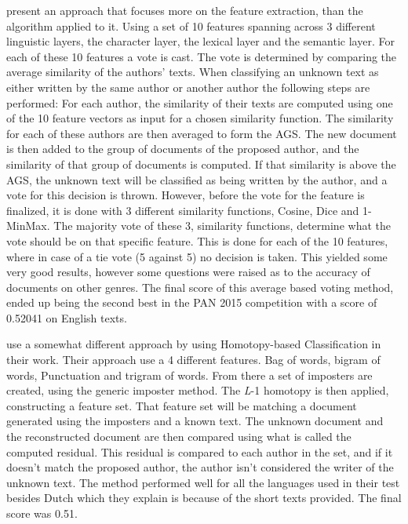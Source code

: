\cite{castro2015Paper} present an approach that focuses more on the feature
extraction, than the algorithm applied to it. Using a set of 10 features
spanning across 3 different linguistic layers, the character layer, the lexical
layer and the semantic layer. For each of these 10 features a vote is cast. The
vote is determined by comparing the average similarity of the authors' texts.
When classifying an unknown text as either written by the same author or another
author the following steps are performed: For each author, the similarity of
their texts are computed using one of the 10 feature vectors as input for a
chosen similarity function. The similarity for each of these authors are then
averaged to form the \gls{AGS}. The new document is then added to the group of
documents of the proposed author, and the similarity of that group of documents
is computed. If that similarity is above the \gls{AGS}, the unknown text will
be classified as being written by the author, and a vote for this decision is
thrown. However, before the vote for the feature is finalized, it is done with
3 different similarity functions, Cosine, Dice and 1-MinMax. The majority vote
of these 3, similarity functions, determine what the vote should be on that
specific feature. This is done for each of the 10 features, where in case of
a tie vote (5 against 5) no decision is taken. This yielded some very good
results, however some questions were raised as to the accuracy of documents on
other genres. The final score of this average based voting method, ended up
being the second best in the PAN 2015 competition with a score of 0.52041 on
English texts.

\cite{gutierrez2015} use a somewhat different approach by using Homotopy-based
Classification in their work. Their approach use a 4 different features. Bag
of words, bigram of words, Punctuation and trigram of words. From there a set
of imposters are created, using the generic imposter method. The \textit{L}-1
homotopy is then applied, constructing a feature set. That feature set will be
matching a document generated using the imposters and a known text. The unknown
document and the reconstructed document are then compared using what is called
the computed residual. This residual is compared to each author in the set,
and if it doesn't match the proposed author, the author isn't considered the
writer of the unknown text. The method performed well for all the languages used
in their test besides Dutch which they explain is because of the short texts
provided. The final score was 0.51.

